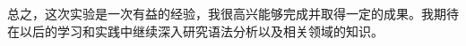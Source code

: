 \documentclass[lang=cn,11pt,a4paper]{elegantpaper}
\begin{document}
总之，这次实验是一次有益的经验，我很高兴能够完成并取得一定的成果。我期待在以后的学习和实践中继续深入研究语法分析以及相关领域的知识。





\end{document}
